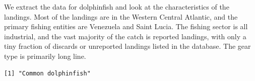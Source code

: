 \documentclass[
  letterpaper,
  oneside,
  open=any]{scrbook}
\newenvironment{Shaded}{\begin{snugshade}}{\end{snugshade}}
\newcommand{\CommentTok}[1]{\textcolor[rgb]{0.37,0.37,0.37}{#1}}
\newcommand{\DecValTok}[1]{\textcolor[rgb]{0.68,0.00,0.00}{#1}}
\newcommand{\FunctionTok}[1]{\textcolor[rgb]{0.28,0.35,0.67}{#1}}
\newcommand{\NormalTok}[1]{\textcolor[rgb]{0.00,0.23,0.31}{#1}}
\newcommand{\OtherTok}[1]{\textcolor[rgb]{0.00,0.23,0.31}{#1}}
\newcommand{\SpecialCharTok}[1]{\textcolor[rgb]{0.37,0.37,0.37}{#1}}
\newcommand{\StringTok}[1]{\textcolor[rgb]{0.13,0.47,0.30}{#1}}
\begin{document}
We extract the data for dolphinfish and look at the characteristics of
the landings. Most of the landings are in the Western Central Atlantic,
and the primary fishing entities are Venezuela and Saint Lucia. The
fishing sector is all industrial, and the vast majority of the catch is
reported landings, with only a tiny fraction of discards or unreported
landings listed in the database. The gear type is primarily long line.

\begin{Shaded}
\end{Shaded}

\begin{verbatim}
[1] "Common dolphinfish"
\end{verbatim}

\begin{Shaded}
\end{Shaded}
\end{document}
